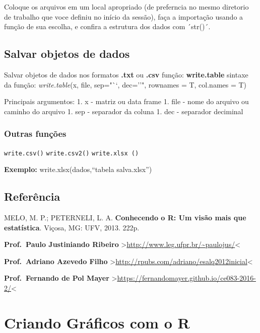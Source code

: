 \documentclass[
]{book}
\begin{document}
Coloque os arquivos em um local apropriado (de preferncia no mesmo diretorio de trabalho que voce definiu no início da sessão), faça a importação usando a função de sua escolha, e confira a estrutura dos dados com ´str()´.

\hypertarget{salvar-objetos-de-dados}{%
\section{Salvar objetos de dados}\label{salvar-objetos-de-dados}}

Salvar objetos de dados nos formatos \textbf{.txt} ou \textbf{.csv}
função: \textbf{write.table}
sintaxe da função:
\emph{write.table}(x, file, sep="``, dec=''", rownames = T, col.names = T)

Principais argumentos:
1. x - matriz ou data frame
1. file - nome do arquivo ou caminho do arquivo
1. sep - separador da coluna
1. dec - separador deciminal

\hypertarget{outras-funuxe7uxf5es}{%
\subsection{Outras funções}\label{outras-funuxe7uxf5es}}

\texttt{write.csv()}
\texttt{write.csv2()}
\texttt{write.xlsx\ ()}

\textbf{Exemplo:}
write.xlsx(dados,``tabela salva.xlsx'')

\hypertarget{referuxeancia-2}{%
\section{Referência}\label{referuxeancia-2}}

MELO, M. P.; PETERNELI, L. A. \textbf{Conhecendo o R: Um visão mais que estatística}. Viçosa, MG: UFV, 2013. 222p.

\textbf{Prof.~Paulo Justiniando Ribeiro} \textgreater{}\url{http://www.leg.ufpr.br/~paulojus/}\textless{}

\textbf{Prof.~Adriano Azevedo Filho} \textgreater{}\url{http://rpubs.com/adriano/esalq2012inicial}\textless{}

\textbf{Prof.~Fernando de Pol Mayer} \textgreater{}\url{https://fernandomayer.github.io/ce083-2016-2/}\textless{}

\hypertarget{criando-gruxe1ficos-com-o-r}{%
\chapter{Criando Gráficos com o R}\label{criando-gruxe1ficos-com-o-r}}
\end{document}
